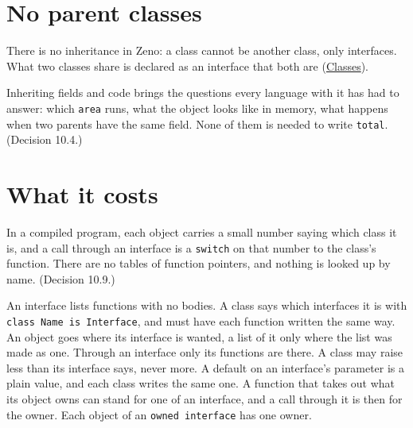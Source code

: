 \section{No parent classes}

There is no inheritance in Zeno: a class cannot be another class, only
interfaces. What two classes share is declared as an interface that
both are (\hyperref[ch-classes]{Classes}).

\begin{why}
Inheriting fields and code brings the questions every language with it
has had to answer: which \verb|area| runs, what the object looks like
in memory, what happens when two parents have the same field. None of
them is needed to write \verb|total|. (Decision 10.4.)
\end{why}

\section{What it costs}

In a compiled program, each object carries a small number saying which
class it is, and a call through an interface is a \verb|switch| on that
number to the class's function. There are no tables of function
pointers, and nothing is looked up by name. (Decision 10.9.)

\begin{summary}
An interface lists functions with no bodies. A class says which
interfaces it is with \verb|class Name is Interface|, and must have
each function written the same way. An object goes where its interface
is wanted, a list of it only where the list was made as one. Through
an interface only its functions are there. A class may raise less than
its interface says, never more. A default on an interface's parameter
is a plain value, and each class writes the same one. A function that
takes out what its object owns can stand for one of an interface, and
a call through it is then for the owner. Each object of an
\verb|owned interface| has one owner.
\end{summary}

